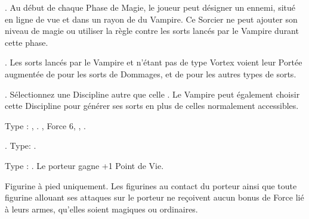  \textbf{\ancientbloodpower}. Au début de chaque Phase de Magie, le joueur peut désigner un \wizard ennemi, situé en ligne de vue et dans un rayon de  du Vampire. Ce Sorcier ne peut ajouter son niveau de magie ou utiliser la règle \aideddispel{} contre les sorts lancés par le Vampire durant cette phase. 

 \textbf{\bloodlinepower}. Les sorts lancés par le Vampire et n'étant pas de type Vortex voient leur Portée augmentée de  pour les sorts de Dommages, et de  pour les autres types de sorts.

 \textbf{\bloodlinepower}. Sélectionnez une Discipline \battle{} autre que celle \nature{}. Le Vampire peut également choisir cette Discipline pour générer ses sorts en plus de celles normalement accessibles.

\endpricelist

\armymagicitems

\armymagicweapons

\startpricelist

 Type : \artilleryweapon{}, \boltthrower{}. , Force 6, , .

 . Type: \hw . 

\endpricelist

\armymagicarmor

\startpricelist

 Type : \platearmour{}. Le porteur gagne +1 Point de Vie.

\endpricelist

\armytalismans

\startpricelist

 Figurine à pied uniquement. Les figurines au contact du porteur ainsi que toute figurine allouant ses attaques sur le porteur ne reçoivent aucun bonus de  Force lié à leurs armes, qu'elles soient magiques ou ordinaires.

